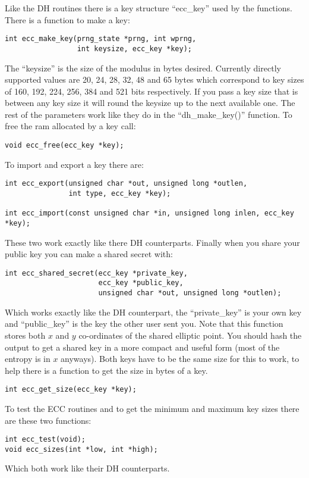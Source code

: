 \documentclass[a4paper]{book}
\begin{document}
Like the DH routines there is a key structure ``ecc\_key'' used by the functions.  There is a function to make a key:
\begin{verbatim}
int ecc_make_key(prng_state *prng, int wprng, 
                 int keysize, ecc_key *key);
\end{verbatim}

The ``keysize'' is the size of the modulus in bytes desired.  Currently directly supported values are 20, 24, 28, 32, 48 and 65 bytes which
correspond to key sizes of 160, 192, 224, 256, 384 and 521 bits respectively.  If you pass a key size that is between any key size
it will round the keysize up to the next available one.  The rest of the parameters work like they do in the ``dh\_make\_key()'' function.  
To free the ram allocated by a key call:
\begin{verbatim}
void ecc_free(ecc_key *key);
\end{verbatim}

To import and export a key there are: 
\begin{verbatim}
int ecc_export(unsigned char *out, unsigned long *outlen, 
               int type, ecc_key *key);

int ecc_import(const unsigned char *in, unsigned long inlen, ecc_key *key);
\end{verbatim}
These two work exactly like there DH counterparts.  Finally when you share your public key you can make a shared secret
with:
\begin{verbatim}
int ecc_shared_secret(ecc_key *private_key, 
                      ecc_key *public_key, 
                      unsigned char *out, unsigned long *outlen);
\end{verbatim}
Which works exactly like the DH counterpart, the ``private\_key'' is your own key and ``public\_key'' is the key the other
user sent you.   Note that this function stores both $x$ and $y$ co-ordinates of the shared
elliptic point.  You should hash the output to get a shared key in a more compact and useful form (most of the entropy is 
in $x$ anyways).  Both keys have to be the same size for this to work, to help there is a function to get the size in bytes
 of a key.
\begin{verbatim}
int ecc_get_size(ecc_key *key);
\end{verbatim}

To test the ECC routines and to get the minimum and maximum key sizes there are these two functions:
\begin{verbatim}
int ecc_test(void);
void ecc_sizes(int *low, int *high);
\end{verbatim}
Which both work like their DH counterparts.
\end{document}
